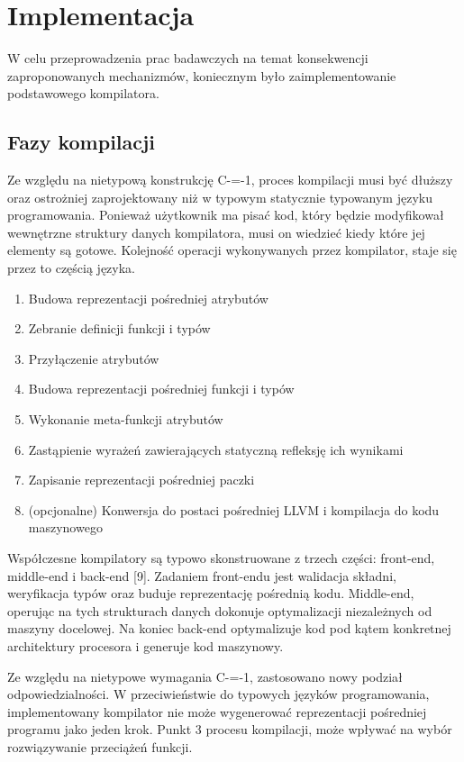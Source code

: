 \section{Implementacja}
W celu przeprowadzenia prac badawczych na temat konsekwencji zaproponowanych mechanizmów, koniecznym było zaimplementowanie podstawowego kompilatora. 
\subsection{Fazy kompilacji}
\label{Compilation_phases}
Ze względu na nietypową konstrukcję C-=-1, proces kompilacji musi być dłuższy oraz ostrożniej zaprojektowany niż w typowym statycznie typowanym języku programowania.
Ponieważ użytkownik ma pisać kod, który będzie modyfikował wewnętrzne struktury danych kompilatora, musi on wiedzieć kiedy które jej elementy są gotowe.
Kolejność operacji wykonywanych przez kompilator, staje się przez to częścią języka.
\begin{enumerate}
    \item Budowa reprezentacji pośredniej atrybutów
    \item Zebranie definicji funkcji i typów
    \item Przyłączenie atrybutów
    \item Budowa reprezentacji pośredniej funkcji i typów
    \item Wykonanie meta-funkcji atrybutów
    \item Zastąpienie wyrażeń zawierających statyczną refleksję ich wynikami
    \item Zapisanie reprezentacji pośredniej paczki
    \item (opcjonalne) Konwersja do postaci pośredniej LLVM i kompilacja do kodu maszynowego
\end{enumerate}

Współczesne kompilatory są typowo skonstruowane z trzech części: front-end, middle-end i back-end [9].
Zadaniem front-endu jest walidacja składni, weryfikacja typów oraz buduje reprezentację pośrednią kodu. Middle-end, operując na tych strukturach danych dokonuje optymalizacji niezależnych od maszyny docelowej.
Na koniec back-end optymalizuje kod pod kątem konkretnej architektury procesora i generuje kod maszynowy.

Ze względu na nietypowe wymagania C-=-1, zastosowano nowy podział odpowiedzialności.
W przeciwieństwie do typowych języków programowania, implementowany kompilator nie może wygenerować reprezentacji pośredniej programu jako jeden krok.
Punkt 3 procesu kompilacji, może wpływać na wybór rozwiązywanie przeciążeń funkcji.

